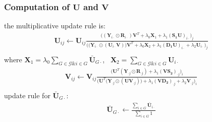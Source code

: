 \documentclass{bioinfo}
\begin{document}
\begin{methods}
\subsubsection{Computation of $\bm{U}$ and $\bm{V}$}
the multiplicative update rule is:
\begin{equation}\label{equ:U_update}
\begin{split}
\bm{U}_{ij}\leftarrow \bm{U}_{ij}
\frac{\Bigg((\bm{Y}_{i\cdot}\odot \bm{R}_{i\cdot})\bm{V}^T+\lambda_0 \bm{X}_1+\lambda_1 (\bm{S_1U})_{i\cdot}\Bigg)_j}
{\Bigg(\big(\bm{Y}_{i\cdot}\odot(\bm{U}_{i\cdot}\bm{V})\big)\bm{V}^T+\lambda_0 \bm{X}_2
+\lambda_1(\bm{D_1U})_{i\cdot}+\lambda_2\bm{U}_{i\cdot}\Bigg)_j}\\
\end{split}
\end{equation}
where $\bm{X}_1=\lambda_0\sum\limits_{G\in\mathcal{G}\&i\in G}^{}\bar{\bm{U}}_{G\cdot}$, \ $\bm{X}_2=\sum\limits_{G\in\mathcal{G}
\&i\in G}^{}\bm{U}_{i\cdot}$
\begin{equation}\label{equ:V_update}
\begin{split}
\bm{V}_{ij}\leftarrow \bm{V}_{ij}
\frac{\Big(\bm{U}^T(\bm{Y}_{\cdot j}\odot \bm{R}_{\cdot j}) + \lambda_1(\bm{VS_2})_{\cdot j}\Big)_i}
{\Big(\bm{U}^T\big(\bm{Y}_{\cdot j}\odot(\bm{U}\bm{V}_{\cdot j})\big)
+\lambda_1(\bm{VD_2})_{\cdot j}+\lambda_2\bm{V}_{\cdot j}\Big)_i}\\
\end{split}
\end{equation}
update rule for $\bar{\bm{U}}_{G\cdot}$:
\begin{equation}\label{equ:V_gradient}
\begin{split}
\bar{\bm{U}}_{G\cdot}\leftarrow
\frac{\sum\limits_{i\in G}^{}\bar{\bm{U}}_{i\cdot}}
{\sum\limits_{i\in G}^{}1}\\
\end{split}
\end{equation}

\end{methods}
\end{document}
